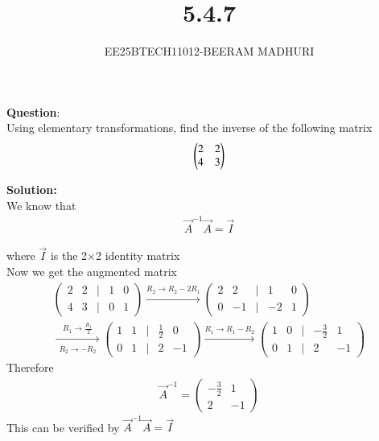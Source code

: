 \documentclass[journal]{IEEEtran}
\begin{document}

\vspace{3cm}

\title{5.4.7}
\author{EE25BTECH11012-BEERAM MADHURI}
{\let\newpage\relax\maketitle}

\renewcommand{\thefigure}{\theenumi}
\renewcommand{\thetable}{\theenumi}
\setlength{\intextsep}{10pt} %


\renewcommand{\thetable}{\theenumi}

\textbf{Question}:\\
Using elementary transformations, find the inverse of the following matrix\\
\begin{align*}
\begin{pmatrix}
$2$ & $2$\\
$4$ & $3$
\end{pmatrix}
\end{align*}

\textbf{Solution:}\\
We know that
\begin{align}
\vec{A}^{-1}\vec{A} = \vec{I} 
\end{align}

\text where $\vec{I}$ is the 2$\times$2 identity matrix\\
Now we get the augmented matrix\\
\begin{align}
\begin{pmatrix}2 & 2 & | & 1 & 0 \\4 & 3 & | & 0 & 1\end{pmatrix}\xrightarrow{R_2 \to R_2 -{2}R_1}\begin{pmatrix}2 & 2 & | & 1 & 0 \\0 & -1 & | & -{2} & 1\end{pmatrix}\\
\xrightarrow[\substack{R_2 \to -R_2}]{R_1 \to \frac{R_1}{2}}\begin{pmatrix}1 & 1 & | & \frac{1}{2} & 0 \\0 & 1 & | & {2} & -1\end{pmatrix}\xrightarrow{R_1 \to R_1 - R_2}\begin{pmatrix}1 & 0 & | & -\frac{3}{2} & 1 \\0 & 1 & | &{2} & -1\end{pmatrix}
\end{align}
Therefore
\begin{align}
\vec{A}^{-1} = \begin{pmatrix}-\frac{3}{2} & 1 \\{2} & -1\end{pmatrix}
\end{align}
This can be verified by $\vec{A}^{-1}\vec{A} = \vec{I}$
\end{document}

